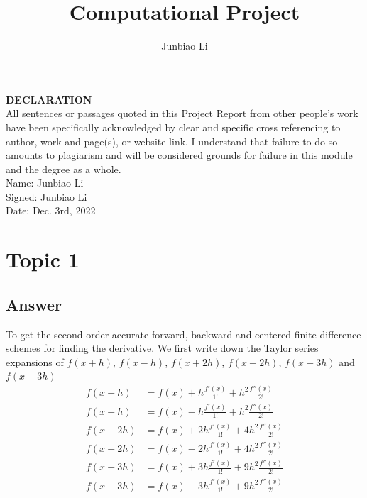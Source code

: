 \documentclass[
	12pt, %
]{fphw}
\title{Computational Project} %
\author{Junbiao Li} %
\institute{University of Leicester} %
\numberwithin{equation}{section}
\numberwithin{figure}{section}
\numberwithin{table}{section}
\begin{document}
\maketitle %

\begin{problem}
\textbf{DECLARATION} \\
All sentences or passages quoted in this Project Report from other people's work have been specifically acknowledged by clear and specific cross referencing to author, work and page(s), or website link. I understand that failure to do so amounts to plagiarism and will be considered grounds for failure in this module and the degree as a whole.\\
Name: Junbiao Li\\
Signed: Junbiao Li\\
Date: Dec. 3rd, 2022
\end{problem}

\section{Topic 1}



\subsection*{Answer}

To get the second-order accurate forward, backward and centered finite difference
schemes for finding the derivative.\cite{numdiff} We first write down the Taylor series expansions of $f(x+h)$, $f(x-h)$, $f(x+2h)$,  $f(x-2h)$, $f(x+3h)$ and $f(x-3h)$
\begin{equation} \label{eq1}
	\begin{aligned}
		f(x+h)  & =f(x)+h\frac{f'(x)}{1 !}+h^2 \frac{f''(x)}{2 !}   \\
		f(x-h)  & =f(x)-h\frac{f'(x)}{1 !}+h^2 \frac{f''(x)}{2 !}   \\
		f(x+2h) & =f(x)+2h\frac{f'(x)}{1 !}+4h^2 \frac{f''(x)}{2 !} \\
		f(x-2h) & =f(x)-2h\frac{f'(x)}{1 !}+4h^2 \frac{f''(x)}{2 !} \\
		f(x+3h) & =f(x)+3h\frac{f'(x)}{1 !}+9h^2 \frac{f''(x)}{2 !} \\
		f(x-3h) & =f(x)-3h\frac{f'(x)}{1 !}+9h^2 \frac{f''(x)}{2 !} \\
	\end{aligned}
\end{equation}
\end{document}
